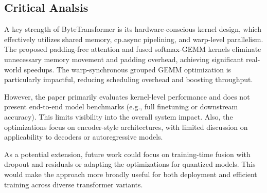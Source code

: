 \documentclass{article}
\begin{document}
\subsection*{Critical Analsis}
A key strength of ByteTransformer is its hardware-conscious kernel design, which effectively utilizes shared memory, cp.async pipelining, and warp-level parallelism. The proposed padding-free attention and fused softmax-GEMM kernels eliminate unnecessary memory movement and padding overhead, achieving significant real-world speedups. The warp-synchronous grouped GEMM optimization is particularly impactful, reducing scheduling overhead and boosting throughput.

However, the paper primarily evaluates kernel-level performance and does not present end-to-end model benchmarks (e.g., full finetuning or downstream accuracy). This limits visibility into the overall system impact. Also, the optimizations focus on encoder-style architectures, with limited discussion on applicability to decoders or autoregressive models.

As a potential extension, future work could focus on training-time fusion with dropout and residuals or adapting the optimizations for quantized models. This would make the approach more broadly useful for both deployment and efficient training across diverse transformer variants.
\end{document}
